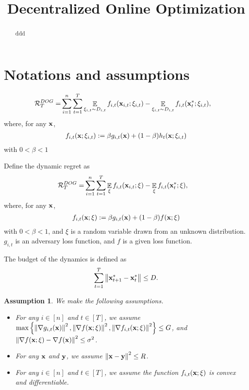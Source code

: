 \documentclass{article}
\title{Decentralized Online Optimization}
\newtheorem{Assumption}{\bf{Assumption}}
\begin{document}
\maketitle

\begin{abstract}
ddd
\end{abstract}

\section{Notations and assumptions}


{\color{red}
\begin{align}
\nonumber
{\mathcal{R}}_T^{DOG} = & \sum_{i=1}^n\sum_{t=1}^T \mathop{\mathbb{E}}_{\xi_{i,t} \sim D_{i,t}}f_{i,t}({\bf x}_{i,t};\xi_{i,t}) - \mathop{\mathbb{E}}_{\xi_{i,t} \sim D_{i,t} }f_{i,t}({\bf x}_t^\ast;\xi_{i,t}),
\end{align} where, for any ${\bf x}$,
\begin{align}
\nonumber
f_{i,t}({\bf x};\xi_{i,t}) := \beta g_{i,t}({\bf x}) + (1-\beta) h_{t}({\bf x}; \xi_{i,t})
\end{align} with $0<\beta<1$

}






Define the dynamic regret as
\begin{align}
\nonumber
{\mathcal{R}}_T^{DOG} = & \sum_{i=1}^n\sum_{t=1}^T \mathop{\mathbb{E}}_{\xi}f_{i,t}({\bf x}_{i,t};\xi) - \mathop{\mathbb{E}}_{\xi}f_{i,t}({\bf x}_t^\ast;\xi),
\end{align} where, for any ${\bf x}$,
\begin{align}
\nonumber
f_{i,t}({\bf x};\xi) := \beta g_{i,t}({\bf x}) + (1-\beta) f({\bf x}; \xi)
\end{align} with $0<\beta<1$, and $\xi$ is a random variable drawn from an unknown distribution. $g_{i,t}$ is an adversary loss function, and $f$ is a given loss function.



The budget of the dynamics is defined as
\begin{align}
\nonumber
\sum_{t=1}^T \left\lVert{\bf x}_{t+1}^\ast - {\bf x}_t^\ast\right\rVert \le D.
\end{align}



\begin{Assumption}
\label{assumption_bounded_gradient_domain}
We make the following assumptions.
\begin{itemize}
\item For any $i\in[n]$ and $t\in[T]$, we assume $\max\left\{\left\lVert\nabla g_{i,t}({\bf x})\right\rVert^2, \left\lVert\nabla f({\bf x};\xi)\right\rVert^2, \left\lVert\nabla f_{i,t}({\bf x}; \xi)\right\rVert^2 \right\} \le G$, and $\left\lVert\nabla f({\bf x}; \xi) - \nabla f({\bf x})\right\rVert^2 \le \sigma^2$.
\item For any ${\bf x}$ and ${\bf y}$, we assume $\left\lVert{\bf x}-{\bf y}\right\rVert^2 \le R$.
\item For any $i\in[n]$ and $t\in[T]$, we assume the function $f_{i,t}({\bf x};\xi)$ is convex and differentiable.
\end{itemize}

 
\end{Assumption}
\end{document}
